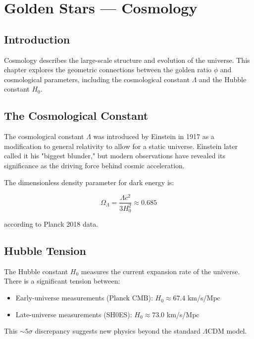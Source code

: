 \chapter{Golden Stars — Cosmology}
\label{ch:19}

\section{Introduction}

Cosmology describes the large-scale structure and evolution of the universe. This chapter explores the geometric connections between the golden ratio $\phi$ and cosmological parameters, including the cosmological constant $\Lambda$ and the Hubble constant $H_0$.

\section{The Cosmological Constant}

The cosmological constant $\Lambda$ was introduced by Einstein in 1917 as a modification to general relativity to allow for a static universe. Einstein later called it his "biggest blunder," but modern observations have revealed its significance as the driving force behind cosmic acceleration.

The dimensionless density parameter for dark energy is:

\begin{equation}
\Omega_\Lambda = \frac{\Lambda c^2}{3H_0^2} \approx 0.685
\end{equation}

according to Planck 2018 data.

\section{Hubble Tension}

The Hubble constant $H_0$ measures the current expansion rate of the universe. There is a significant tension between:
\begin{itemize}
    \item Early-universe measurements (Planck CMB): $H_0 \approx 67.4$ km/s/Mpc
    \item Late-universe measurements (SH0ES): $H_0 \approx 73.0$ km/s/Mpc
\end{itemize}

This $\sim 5\sigma$ discrepancy suggests new physics beyond the standard $\Lambda$CDM model.

